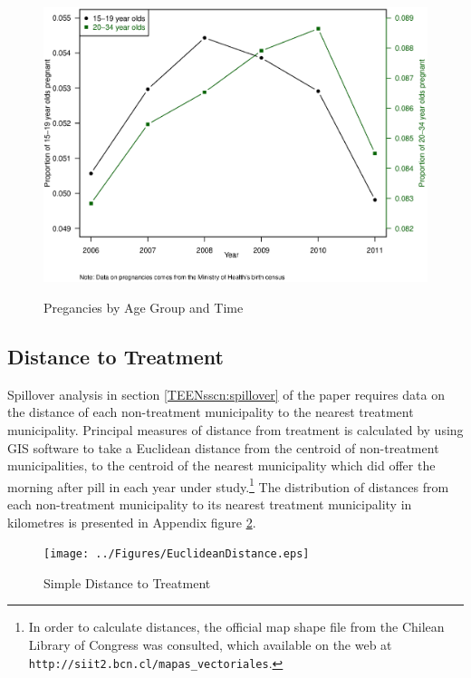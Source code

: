 \documentclass[11pt,subeqn]{article}
\renewcommand\thesection{\Alph{section}}
\begin{document}
\begin{spacing}{1.4}
\begin{figure}[htpb!]
\begin{center}
\caption{Pregancies by Age Group and Time}
\vspace{-5mm}
\label{TEENfig:Pregtime}
\includegraphics[scale=0.54]{../Figures/Births.eps} 
\end{center}
\end{figure}


\clearpage
\renewcommand\thesection{\Alph{section}}
\setlength\parindent{0.25in}
\setlength\parskip{0.25in}

\subsection{Distance to Treatment}
Spillover analysis in section \ref{TEENsscn:spillover} of the paper requires
data on the distance of each non-treatment municipality to the nearest 
treatment municipality.  Principal measures of distance from treatment is 
calculated by using GIS software to take a Euclidean distance from the 
centroid of non-treatment municipalities, to the centroid of the nearest 
municipality which did offer the morning after pill in each year under 
study.\footnote{In order to calculate distances, the official map shape file
from the Chilean Library of Congress was consulted, which available on the
web at \texttt{http://siit2.bcn.cl/mapas_vectoriales}.}  The distribution of
distances from each non-treatment municipality to its nearest treatment 
municipality in kilometres is presented in Appendix figure \ref{dist}.

\begin{figure}[htpb!]
\texttt{[image: ../Figures/EuclideanDistance.eps]}
\caption{Simple Distance to Treatment}
\label{dist}
\end{figure}



\end{spacing}
\end{document}
